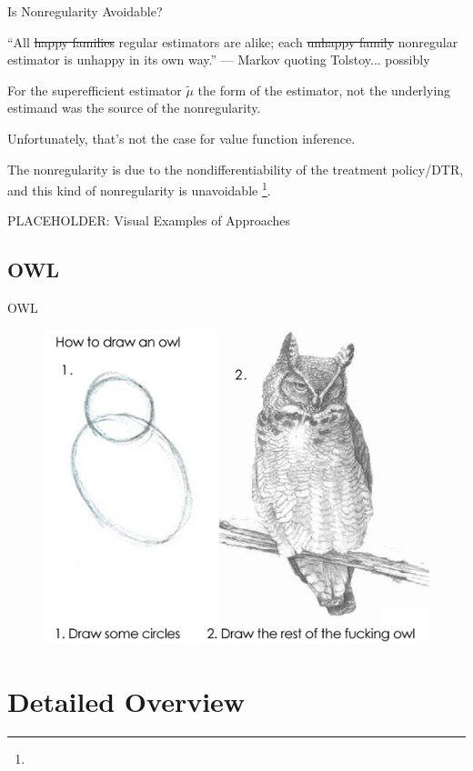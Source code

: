 \documentclass[aspectratio=169, professionalfonts]{beamer}
\begin{document}
\begin{frame}{Is Nonregularity Avoidable?}

	``All \sout{happy families} regular estimators are alike; each \sout{unhappy
		family} nonregular estimator is unhappy in its own way.'' --- Markov
	quoting Tolstoy\pause... possibly

	\vfill \pause
	For the superefficient estimator $\tilde{\mu}$ the form of the estimator, not
	the underlying estimand was the source of the nonregularity.

	\vfill \pause

	Unfortunately, that's not the case for value function inference.

	\vfill

	The nonregularity is due to the nondifferentiability of the treatment
	policy/DTR, and this kind of nonregularity is unavoidable
	\footnote<4->{}.
	\vfill
\end{frame}


\begin{frame}{PLACEHOLDER: Visual Examples of Approaches}
\end{frame}

\subsection{OWL}
\begin{frame}{OWL}
	\begin{figure}
		\includegraphics[width=.6\textwidth]{figures/how-to-draw-an-owl}
	\end{figure}
\end{frame}

\section{Detailed Overview}
\end{document}
